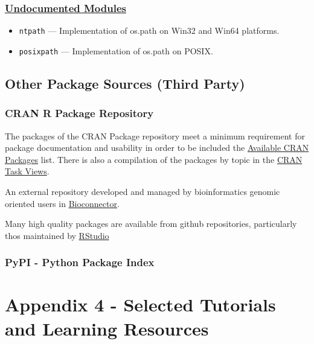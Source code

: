 \documentclass[]{book}
\providecommand{\tightlist}{%
  \setlength{\itemsep}{0pt}\setlength{\parskip}{0pt}}
\theoremstyle{definition}
\theoremstyle{definition}
\theoremstyle{definition}
\theoremstyle{remark}
\begin{document}
\subsection{\texorpdfstring{\href{https://docs.python.org/3.7/library/undoc.html}{Undocumented
Modules}}{Undocumented Modules}}\label{undocumented-modules}

\begin{itemize}
\tightlist
\item
  \texttt{ntpath} --- Implementation of os.path on Win32 and Win64
  platforms.
\item
  \texttt{posixpath} --- Implementation of os.path on POSIX.
\end{itemize}

\section{Other Package Sources (Third
Party)}\label{other-package-sources-third-party}

\subsection{CRAN R Package Repository}\label{cran-r-package-repository}

The packages of the CRAN Package repository meet a minimum requirement
for package documentation and usability in order to be included the
\href{https://cran.cnr.berkeley.edu/web/packages/index.html}{Available
CRAN Packages} list. There is also a compilation of the packages by
topic in the \href{https://cran.cnr.berkeley.edu/web/views/}{CRAN Task
Views}.

An external repository developed and managed by bioinformatics genomic
oriented users in \href{https://www.bioconductor.org/}{Bioconnector}.

Many high quality packages are available from github repositories,
particularly thos maintained by
\href{https://www.rstudio.com/products/rpackages/}{RStudio}

\subsection{PyPI - Python Package
Index}\label{pypi---python-package-index}

\chapter{Appendix 4 - Selected Tutorials and Learning
Resources}\label{appendix-4---selected-tutorials-and-learning-resources}
\end{document}
